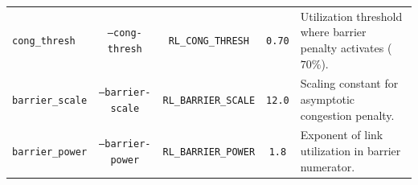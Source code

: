 \begin{table}[htbp]
\begin{tabularx}{\textwidth}{l c c c X}
\texttt{cong\_thresh} & \texttt{--cong-thresh} & \texttt{RL\_CONG\_THRESH} & \texttt{0.70} & Utilization threshold where barrier penalty activates ($70\%$). \\
\texttt{barrier\_scale} & \texttt{--barrier-scale} & \texttt{RL\_BARRIER\_SCALE} & \texttt{12.0} & Scaling constant for asymptotic congestion penalty. \\
\texttt{barrier\_power} & \texttt{--barrier-power} & \texttt{RL\_BARRIER\_POWER} & \texttt{1.8} & Exponent of link utilization in barrier numerator. \\
\bottomrule
\end{tabularx}
\end{table}
